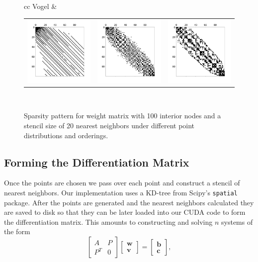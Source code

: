 \documentclass[12pt]{article}
\begin{document}
\begin{figure}[ht]
\begin{tabular}{cc}
		Vogel & \begin{tabular}{ccc}
			\includegraphics[width=.2\textwidth]{spy_vogel_unordered.png} &
			\includegraphics[width=.2\textwidth]{spy_vogel_xorder.png} &
			\includegraphics[width=.2\textwidth]{spy_vogel_rcm.png}  \end{tabular} \\
	\end{tabular}
	\caption{Sparsity pattern for weight matrix with 100 interior nodes and a stencil size of 20 nearest neighbors under different point distributions and orderings.}
	\label{orderings}
\end{figure}


\subsection{Forming the Differentiation Matrix}

	Once the points are chosen we pass over each point and construct a stencil of nearest neighbors. Our implementation uses a KD-tree from Scipy's \texttt{spatial} package. After the points are generated and the nearest neighbors calculated they are saved to disk so that they can be later loaded into our CUDA code to form the differentiation matrix. This amounts to constructing and solving $n$ systems of the form
	$$
	\begin{bmatrix}
	A &P\\
	P^T &0
	\end{bmatrix}
	\begin{bmatrix}
	\mathbf{w}\\
	\mathbf{v}
	\end{bmatrix}
	=
	\begin{bmatrix}
	\mathbf{b}\\
	\mathbf{c}
	\end{bmatrix},
	$$
	
\end{document}
